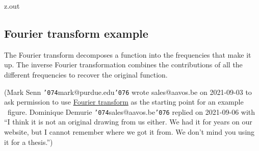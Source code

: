 \MyIO


\begin{VerbatimOut}{z.out}

\subsection{Fourier transform example}
\label{ss:fourier-transform-example}
  
The Fourier transform decomposes a function
into the frequencies that make it up.
The inverse Fourier transformation combines the contributions
of all the different frequencies to recover the original function.

(Mark Senn {\tt\char'074}mark@purdue.edu{\tt\char'076} wrote sales@aavos.be on 2021-09-03
to ask permission
to use
\href{https://aavos.eu/glossary/fourier-transform/}{Fourier transform}
as the starting point
for an example \TikZLogo\ figure.  
Dominique Demurie {\tt\char'074}sales@aavos.be{\tt\char'076} replied
on 2021-09-06 with
``I think it is not an original drawing from us either.
We had it for years on our website,
but I cannot remember where we got it from.
We don't mind you using it for a thesis.'')

%
%
  
\end{VerbatimOut}
